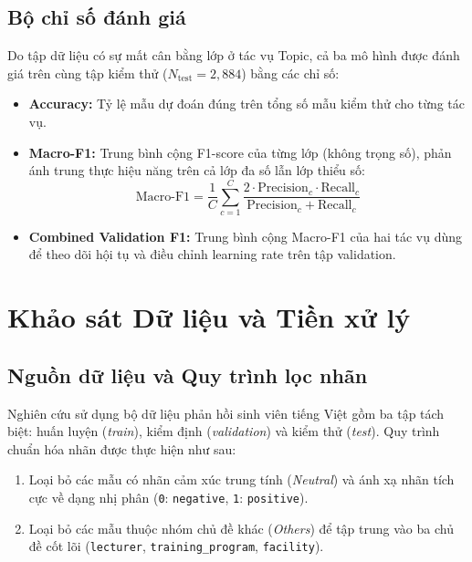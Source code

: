 \documentclass[a4paper,12pt]{article}
\begin{document}
\subsection{Bộ chỉ số đánh giá}
Do tập dữ liệu có sự mất cân bằng lớp ở tác vụ Topic, cả ba mô hình được đánh giá trên cùng tập kiểm thử ($N_{\text{test}} = 2{,}884$) bằng các chỉ số:
\begin{itemize}
    \item \textbf{Accuracy:} Tỷ lệ mẫu dự đoán đúng trên tổng số mẫu kiểm thử cho từng tác vụ.
    \item \textbf{Macro-F1:} Trung bình cộng F1-score của từng lớp (không trọng số), phản ánh trung thực hiệu năng trên cả lớp đa số lẫn lớp thiểu số:
    \[
        \text{Macro-F1} = \frac{1}{C} \sum_{c=1}^{C} \frac{2 \cdot \text{Precision}_c \cdot \text{Recall}_c}{\text{Precision}_c + \text{Recall}_c}
    \]
    \item \textbf{Combined Validation F1:} Trung bình cộng Macro-F1 của hai tác vụ dùng để theo dõi hội tụ và điều chỉnh learning rate trên tập validation.
\end{itemize}

\section{Khảo sát Dữ liệu và Tiền xử lý}

\subsection{Nguồn dữ liệu và Quy trình lọc nhãn}
Nghiên cứu sử dụng bộ dữ liệu phản hồi sinh viên tiếng Việt gồm ba tập tách biệt: huấn luyện (\textit{train}), kiểm định (\textit{validation}) và kiểm thử (\textit{test}). Quy trình chuẩn hóa nhãn được thực hiện như sau:
\begin{enumerate}
    \item Loại bỏ các mẫu có nhãn cảm xúc trung tính (\textit{Neutral}) và ánh xạ nhãn tích cực về dạng nhị phân (\texttt{0}: \texttt{negative}, \texttt{1}: \texttt{positive}).
    \item Loại bỏ các mẫu thuộc nhóm chủ đề khác (\textit{Others}) để tập trung vào ba chủ đề cốt lõi (\texttt{lecturer}, \texttt{training\_program}, \texttt{facility}).
\end{enumerate}
\end{document}
